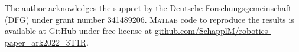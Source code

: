 \documentclass[
	graybox,
	vecphys] %
	{svmult}
\begin{document}
\begin{acknowledgement}
\vspace{-0.2cm}
The author acknowledges the support by the Deutsche Forschungsgemeinschaft (DFG) under grant number 341489206. \textsc{Matlab} code to reproduce the results
is available at GitHub under free license at \url{github.com/SchapplM/robotics-paper_ark2022_3T1R}.
%
\end{acknowledgement}

\vspace{-0.4cm}


\end{document}
